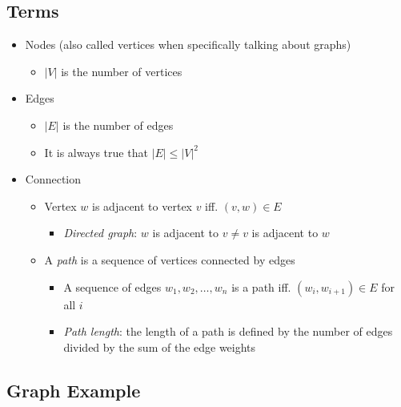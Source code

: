 \documentclass[
  10pt,
  english,
  letterpaper,
,tablecaptionabove
]{scrartcl}
\providecommand{\tightlist}{%
  \setlength{\itemsep}{0pt}\setlength{\parskip}{0pt}}
\begin{document}
\hypertarget{terms}{%
\subsection{Terms}\label{terms}}

\begin{itemize}
\tightlist
\item
  Nodes (also called vertices when specifically talking about graphs)

  \begin{itemize}
  \tightlist
  \item
    \(|V|\) is the number of vertices
  \end{itemize}
\item
  Edges

  \begin{itemize}
  \tightlist
  \item
    \(|E|\) is the number of edges
  \item
    It is always true that \(|E| \leq |V|^2\)
  \end{itemize}
\item
  Connection

  \begin{itemize}
  \tightlist
  \item
    Vertex \(w\) is adjacent to vertex \(v\) iff. \((v,w) \in E\)

    \begin{itemize}
    \tightlist
    \item
      \emph{Directed graph}: \(w\) is adjacent to \(v\neq v\) is
      adjacent to \(w\)
    \end{itemize}
  \item
    A \emph{path} is a sequence of vertices connected by edges

    \begin{itemize}
    \tightlist
    \item
      A sequence of edges \(w_1, w_2, \dots, w_n\) is a path iff.
      \((w_i, w_{i+1}) \in E\) for all \(i\)
    \item
      \emph{Path length}: the length of a path is defined by the number
      of edges divided by the sum of the edge weights
    \end{itemize}
  \end{itemize}
\end{itemize}

\hypertarget{graph-example}{%
\subsection{Graph Example}\label{graph-example}}
\end{document}
